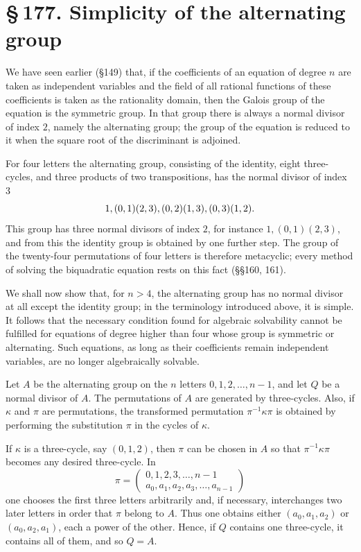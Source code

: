 \documentclass[11pt]{article}
\providecommand{\sect}[2]{\section*{\S\,#1. #2}}
\providecommand{\perm}[2]{\begin{pmatrix}#1\\#2\end{pmatrix}}
\begin{document}
\sect{177}{Simplicity of the alternating group}

We have seen earlier (§149) that, if the coefficients of an equation of degree $n$ are taken as independent variables and the field of all rational functions of these coefficients is taken as the rationality domain, then the Galois group of the equation is the symmetric group. In that group there is always a normal divisor of index $2$, namely the alternating group; the group of the equation is reduced to it when the square root of the discriminant is adjoined.

For four letters the alternating group, consisting of the identity, eight three-cycles, and three products of two transpositions, has the normal divisor of index $3$
\[
  1,\\ (0,1)(2,3),\\ (0,2)(1,3),\\ (0,3)(1,2).
\]
This group has three normal divisors of index $2$, for instance $1,(0,1)(2,3)$, and from this the identity group is obtained by one further step. The group of the twenty-four permutations of four letters is therefore metacyclic; every method of solving the biquadratic equation rests on this fact (§§160, 161).

We shall now show that, for $n>4$, the alternating group has no normal divisor at all except the identity group; in the terminology introduced above, it is simple. It follows that the necessary condition found for algebraic solvability cannot be fulfilled for equations of degree higher than four whose group is symmetric or alternating. Such equations, as long as their coefficients remain independent variables, are no longer algebraically solvable.

Let $A$ be the alternating group on the $n$ letters $0,1,2,\ldots,n-1$, and let $Q$ be a normal divisor of $A$. The permutations of $A$ are generated by three-cycles. Also, if $\kappa$ and $\pi$ are permutations, the transformed permutation $\pi^{-1}\kappa\pi$ is obtained by performing the substitution $\pi$ in the cycles of $\kappa$.

If $\kappa$ is a three-cycle, say $(0,1,2)$, then $\pi$ can be chosen in $A$ so that $\pi^{-1}\kappa\pi$ becomes any desired three-cycle. In
\[
  \pi=\perm{0,1,2,3,\ldots,n-1}{a_0,a_1,a_2,a_3,\ldots,a_{n-1}}
\]
one chooses the first three letters arbitrarily and, if necessary, interchanges two later letters in order that $\pi$ belong to $A$. Thus one obtains either $(a_0,a_1,a_2)$ or $(a_0,a_2,a_1)$, each a power of the other. Hence, if $Q$ contains one three-cycle, it contains all of them, and so $Q=A$.
\end{document}
